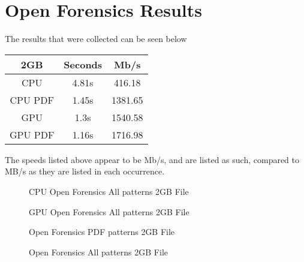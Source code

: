 \section{Open Forensics Results}
\label{sec:OpenForensicsAppendix}

The results that were collected can be seen below


{\centering
\begin{tabular}{c | c | c}
2GB & Seconds & Mb/s \\
\hline
CPU & 4.81s & 416.18 \\
CPU PDF & 1.45s & 1381.65 \\
GPU & 1.3s & 1540.58 \\
GPU PDF & 1.16s & 1716.98 \\
\end{tabular}
\label{tab:OpenForensics2GB}
\par}

The speeds listed above appear to be Mb/s, and are listed as such, compared to MB/s as they are listed in each occurrence.
\newpage

\begin{figure}[!t]
\texttt{}
\caption{CPU Open Forensics All patterns 2GB File}
\label{fig:OF2CPUAllPat}
\end{figure}
\newpage
\begin{figure}[!t]
\texttt{}
\caption{GPU Open Forensics All patterns 2GB File}
\label{fig:OF2GPUAllPat}
\end{figure}
\newpage
\begin{figure}[!t]
\texttt{}
\caption{Open Forensics PDF patterns 2GB File}
\label{fig:OF2CPUPDF}
\end{figure}
\newpage
\begin{figure}[!t]
\texttt{}
\caption{Open Forensics All patterns 2GB File}
\label{fig:OF2GPUPFD}
\end{figure}
 